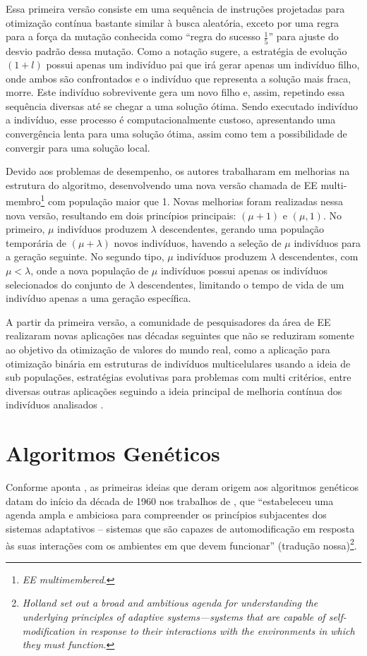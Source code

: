 Essa primeira versão consiste em uma sequência de instruções projetadas para otimização contínua bastante similar à busca aleatória, exceto por uma regra para a força da mutação conhecida como \enquote{regra do sucesso $\frac{1}{5}$} para ajuste do desvio padrão dessa mutação. Como a notação sugere, a estratégia de evolução $(1 + l)$ possui apenas um indivíduo pai que irá gerar apenas um indivíduo filho, onde ambos são confrontados e o indivíduo que representa a solução mais fraca, morre. Este indivíduo sobrevivente gera um novo filho e, assim, repetindo essa sequência diversas até se chegar a uma solução ótima. Sendo executado indivíduo a indivíduo, esse processo é computacionalmente custoso, apresentando uma convergência lenta para uma solução ótima, assim como tem a possibilidade de convergir para uma solução local.

Devido aos problemas de desempenho, os autores trabalharam em melhorias na estrutura do algoritmo, desenvolvendo uma nova versão chamada de EE multi-membro\footnote{\textit{EE multimembered}.} com população maior que 1. Novas melhorias foram realizadas nessa nova versão, resultando em dois princípios principais: $(\mu+1)$ e $(\mu, 1)$. No primeiro, $\mu$ indivíduos produzem $\lambda$ descendentes, gerando uma população temporária de $(\mu + \lambda)$ novos indivíduos, havendo a seleção de $\mu$ indivíduos para a geração seguinte. No segundo tipo, $\mu$ indivíduos produzem $\lambda$ descendentes, com $\mu < \lambda$, onde a nova população de $\mu$ indivíduos possui apenas os indivíduos selecionados do conjunto de $\lambda$ descendentes, limitando o tempo de vida de um indivíduo apenas a uma geração específica.

A partir da primeira versão, a comunidade de pesquisadores da área de EE realizaram novas aplicações nas décadas seguintes que não se reduziram somente ao objetivo da otimização de valores do mundo real, como a aplicação para otimização binária em estruturas de indivíduos multicelulares usando a ideia de sub populações, estratégias evolutivas para problemas com multi critérios, entre diversas outras aplicações seguindo a ideia principal de melhoria contínua dos indivíduos analisados .

\section{Algoritmos Genéticos} 

Conforme aponta , as primeiras ideias que deram origem aos algoritmos genéticos datam do início da década de 1960 nos trabalhos de \cite{holland_1962}, que \enquote{estabeleceu uma agenda ampla e ambiciosa para compreender os princípios subjacentes dos sistemas adaptativos – sistemas que são capazes de automodificação em resposta às suas interações com os ambientes em que devem funcionar} (tradução nossa)\footnote{\textit{Holland set out a broad and ambitious agenda for understanding the underlying principles of adaptive systems—systems that are capable of self-modification in response to their interactions with the environments in which they must function.}}.

